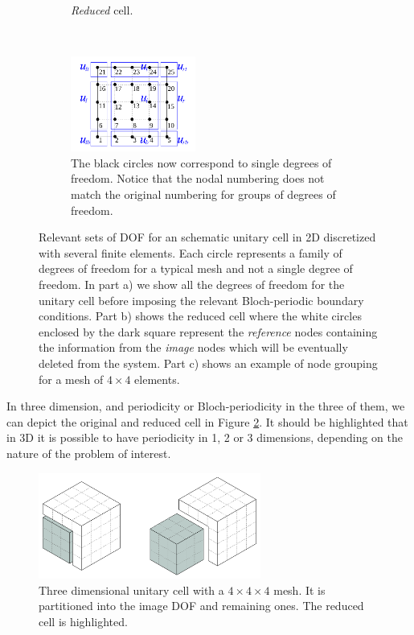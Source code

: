 \begin{figure}[h]
\begin{subfigure}[b]{0.3\textwidth}
		\caption{\emph{Reduced} cell.}
	\end{subfigure}\\
%
	\begin{subfigure}[b]{0.7\textwidth}\qquad
		\centering
		\includegraphics[width=0.45\textwidth]{img/cell_FEM-nodes.pdf}
		\caption{The black circles now correspond to single degrees of freedom. Notice that the nodal numbering does not match the original numbering for groups of degrees of freedom.}
	\end{subfigure}
\caption{Relevant sets of DOF for an schematic unitary cell in 2D discretized with several finite elements. Each circle represents a family of degrees of freedom for a typical mesh and not a single degree of freedom. In part a) we show all the degrees of freedom for the unitary cell before imposing the relevant Bloch-periodic boundary conditions. Part b) shows the reduced cell where the white circles enclosed by the dark square represent the \emph{reference} nodes containing the information from the \emph{image} nodes which will be eventually deleted from the system. Part c) shows an example of node grouping for a mesh of $4\times 4$ elements.}
\label{fig:bloch_FEM}
\end{figure}

In three dimension, and periodicity or Bloch-periodicity in the three of them, we can depict the original and reduced cell in Figure \ref{fig:bloch_3D_cell}. It should be highlighted that in 3D it is possible to have periodicity in 1, 2 or 3 dimensions, depending on the nature of the problem of interest.
\begin{figure}[h]
	\centering
	\includegraphics[width=0.65\textwidth]{img/Cube_Bloch_Schematic.pdf}
	\caption{Three dimensional unitary cell with a $4\times4\times4$ mesh. It is partitioned into the image DOF and remaining ones. The reduced cell is highlighted.}
	\label{fig:bloch_3D_cell}
\end{figure}

